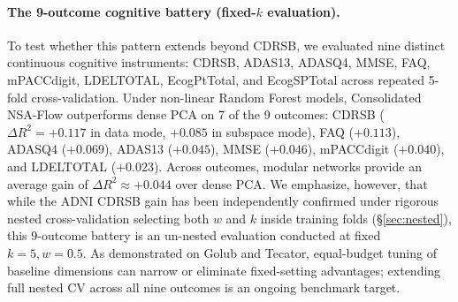 \documentclass[11pt]{article}
\theoremstyle{definition}
\begin{document}
\paragraph{The 9-outcome cognitive battery (fixed-$k$ evaluation).}
To test whether this pattern extends beyond CDRSB, we evaluated nine distinct continuous cognitive instruments: CDRSB, ADAS13, ADASQ4, MMSE, FAQ, mPACCdigit, LDELTOTAL, EcogPtTotal, and EcogSPTotal across repeated 5-fold cross-validation. Under non-linear Random Forest models, Consolidated NSA-Flow outperforms dense PCA on 7 of the 9 outcomes: CDRSB ($\Delta R^2 = +0.117$ in data mode, $+0.085$ in subspace mode), FAQ ($+0.113$), ADASQ4 ($+0.069$), ADAS13 ($+0.045$), MMSE ($+0.046$), mPACCdigit ($+0.040$), and LDELTOTAL ($+0.023$). Across outcomes, modular networks provide an average gain of $\Delta R^2 \approx +0.044$ over dense PCA. We emphasize, however, that while the ADNI CDRSB gain has been independently confirmed under rigorous nested cross-validation selecting both $w$ and $k$ inside training folds (\S\ref{sec:nested}), this 9-outcome battery is an un-nested evaluation conducted at fixed $k=5, w=0.5$. As demonstrated on Golub and Tecator, equal-budget tuning of baseline dimensions can narrow or eliminate fixed-setting advantages; extending full nested CV across all nine outcomes is an ongoing benchmark target.
\end{document}
